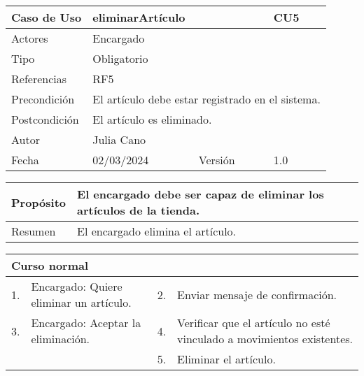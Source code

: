 \begin{table}[H]
	\centering
	\begin{tabular}{| m{} | m{} | m{} | m{} |}
		\hline
		\rowcolor{grayshade} Caso de Uso & \multicolumn{2}{|m{0.43\textwidth}|}{eliminarArtículo} &  CU5\\ 
		\hline
		Actores & \multicolumn{3}{l|}{Encargado} \\ 
		\hline
		Tipo & \multicolumn{3}{l|}{Obligatorio} \\ 
		\hline
		Referencias & \multicolumn{3}{l|}{RF5} \\ 
		\hline
		Precondición & \multicolumn{3}{m{0.67\textwidth}|}{El artículo debe estar registrado en el sistema.} \\ 
		\hline
		Postcondición & \multicolumn{3}{l|}{El artículo es eliminado.} \\ 
		\hline
		Autor & \multicolumn{3}{l|}{Julia Cano} \\ 
		\hline
		Fecha & 02/03/2024 & Versión & 1.0 \\
		\hline
	\end{tabular}
\end{table}

\begin{table}[H]
	\centering
	\begin{tabular}{| m{} | m{} | m{} | m{} |}
		\hline
		Propósito & \multicolumn{3}{m{0.67\textwidth}|}{El encargado debe ser capaz de eliminar los artículos de la tienda.}   \\ 
		\hline
		Resumen & \multicolumn{3}{m{0.67\textwidth}|}{El encargado elimina el artículo.} \\ 
		\hline
	\end{tabular}
\end{table}


\begin{table}[H]
	\centering
	\begin{tabular}{| m{} | m{} | m{} | m{} |}
		\hline
		\multicolumn{4}{|m{0.9\textwidth}|}{Curso normal}     \\ 
		\hline
		1. & Encargado: Quiere eliminar un artículo. & 2. &  Enviar mensaje de confirmación.  \\ 
		\hline
		3. & Encargado: Aceptar la eliminación. & 4. & Verificar que el artículo no esté vinculado a movimientos existentes. \\ 
		\hline
		& & 5. & Eliminar el artículo. \\ 
		\hline
	\end{tabular}
\end{table}

